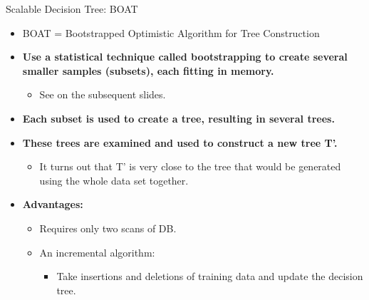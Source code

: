 \begin{frame}{Scalable Decision Tree: BOAT}
	\begin{itemize}
		\item BOAT = Bootstrapped Optimistic Algorithm for Tree Construction
		\item \textbf{Use a statistical technique called bootstrapping to create several smaller samples (subsets), each fitting in memory.}
		      \begin{itemize}
			      \item See on the subsequent slides.
		      \end{itemize}
		\item \textbf{Each subset is used to create a tree, resulting in several trees.}
		\item \textbf{These trees are examined and used to construct a new tree T'.}
		      \begin{itemize}
			      \item It turns out that T' is very close to the tree that would be generated \\
			            using the whole data set together.
		      \end{itemize}
		\item \textbf{Advantages:}
		      \begin{itemize}
			      \item Requires only two scans of DB.
			      \item An incremental algorithm:
			            \begin{itemize}
				            \item Take insertions and deletions of training data and update the decision tree.
			            \end{itemize}
		      \end{itemize}
	\end{itemize}
\end{frame}
